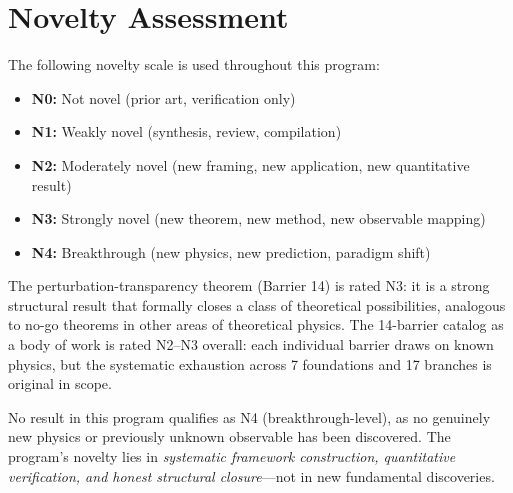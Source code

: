 \documentclass[a4paper,11pt]{article}
\begin{document}
\section{Novelty Assessment}
\label{app:novelty}

The following novelty scale is used throughout this program:

\begin{itemize}
\item \textbf{N0:} Not novel (prior art, verification only)
\item \textbf{N1:} Weakly novel (synthesis, review, compilation)
\item \textbf{N2:} Moderately novel (new framing, new application, new quantitative result)
\item \textbf{N3:} Strongly novel (new theorem, new method, new observable mapping)
\item \textbf{N4:} Breakthrough (new physics, new prediction, paradigm shift)
\end{itemize}

The perturbation-transparency theorem (Barrier 14) is rated N3: it is a strong structural result that formally closes a class of theoretical possibilities, analogous to no-go theorems in other areas of theoretical physics. The 14-barrier catalog as a body of work is rated N2--N3 overall: each individual barrier draws on known physics, but the systematic exhaustion across 7 foundations and 17 branches is original in scope.

No result in this program qualifies as N4 (breakthrough-level), as no genuinely new physics or previously unknown observable has been discovered. The program's novelty lies in \emph{systematic framework construction, quantitative verification, and honest structural closure}---not in new fundamental discoveries.


\end{document}
